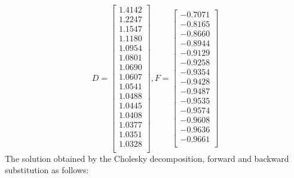 \documentclass[12pt, a4paper]{article}
\begin{document}
\begin{equation}
D =
\begin{bmatrix}
1.4142 \\
1.2247 \\
1.1547 \\
1.1180 \\
1.0954 \\
1.0801 \\
1.0690 \\
1.0607 \\
1.0541 \\
1.0488 \\
1.0445 \\
1.0408 \\
1.0377 \\
1.0351 \\
1.0328 \\
\end{bmatrix},
F =
\begin{bmatrix}
-0.7071 \\
-0.8165 \\
-0.8660 \\
-0.8944 \\
-0.9129 \\
-0.9258 \\
-0.9354 \\
-0.9428 \\
-0.9487 \\
-0.9535 \\
-0.9574 \\
-0.9608 \\
-0.9636 \\
-0.9661\\
\end{bmatrix}
\end{equation}
The solution obtained by the Cholesky decomposition, forward and backward substitution as follows:
\end{document}
